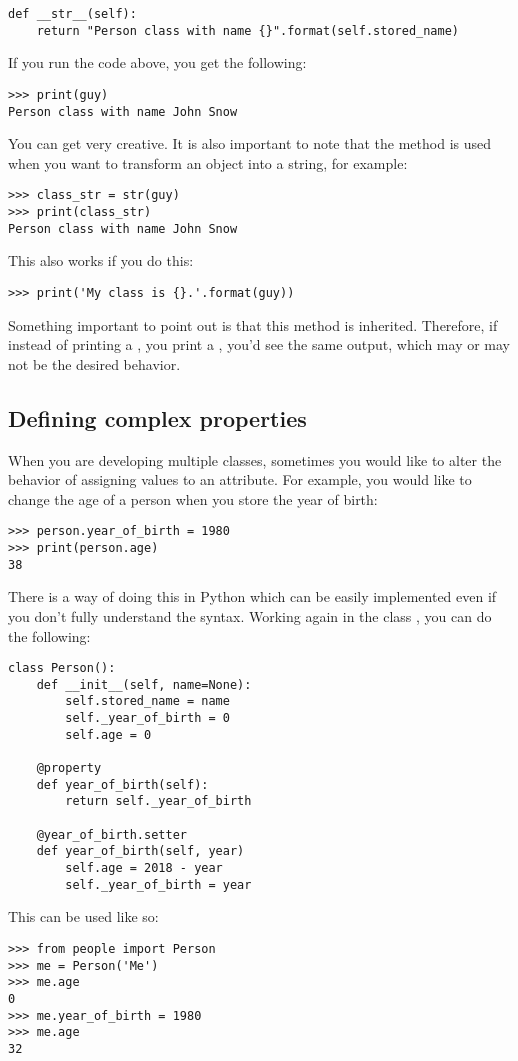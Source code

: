 \begin{verbatim}
def __str__(self):
    return "Person class with name {}".format(self.stored_name)
\end{verbatim}

If you run the code above, you get the following:
\begin{verbatim}
>>> print(guy)
Person class with name John Snow
\end{verbatim}

You can get very creative. It is also important to note that the method  is used when you want to transform an object into a string, for example:

\begin{verbatim}
>>> class_str = str(guy)
>>> print(class_str)
Person class with name John Snow
\end{verbatim}

This also works if you do this:

\begin{verbatim}
>>> print('My class is {}.'.format(guy))
\end{verbatim}

Something important to point out is that this method is inherited. Therefore, if instead of printing a , you print a , you'd see the same output, which may or may not be the desired behavior.

\subsection{Defining complex properties}\label{subsec:defining-complex-properties}
When you are developing multiple classes, sometimes you would like to alter the behavior of assigning values to an attribute. For example, you would like to change the age of a person when you store the year of birth:
\begin{verbatim}
>>> person.year_of_birth = 1980
>>> print(person.age)
38
\end{verbatim}

There is a way of doing this in Python which can be easily implemented even if you don't fully understand the syntax. Working again in the class , you can do the following:
\begin{verbatim}
class Person():
    def __init__(self, name=None):
        self.stored_name = name
        self._year_of_birth = 0
        self.age = 0

    @property
    def year_of_birth(self):
        return self._year_of_birth

    @year_of_birth.setter
    def year_of_birth(self, year)
        self.age = 2018 - year
        self._year_of_birth = year
\end{verbatim}
This can be used like so:
\begin{verbatim}
>>> from people import Person
>>> me = Person('Me')
>>> me.age
0
>>> me.year_of_birth = 1980
>>> me.age
32
\end{verbatim}

